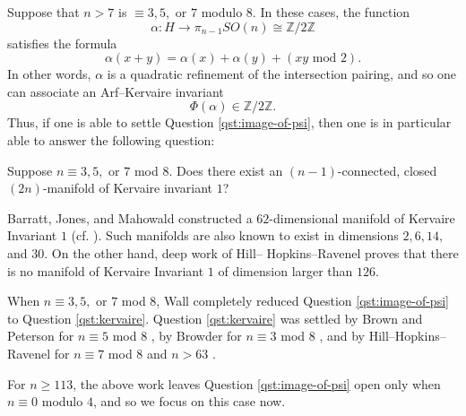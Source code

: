 \begin{exm}
Suppose that $n>7$ is $\equiv 3,5,$ or $7$ modulo $8$.  In these cases, the function
$$\alpha:H \to \pi_{n-1} SO(n) \cong \mathbb{Z}/2\mathbb{Z}$$
satisfies the formula
$$\alpha(x+y) = \alpha(x) + \alpha(y) + (xy \text{ mod }2).$$
In other words, $\alpha$ is a quadratic refinement of the intersection pairing, and so one can associate an Arf--Kervaire invariant
$$\Phi(\alpha) \in \mathbb{Z}/2\mathbb{Z}.$$
Thus, if one is able to settle Question \ref{qst:image-of-psi}, then one is in particular able to answer the following question:
\end{exm}

\begin{qst} \label{qst:kervaire}
Suppose $n \equiv 3,5,$ or $7$ mod $8$.  Does there exist an $(n-1)$-connected, closed $(2n)$-manifold of Kervaire invariant $1$?
\end{qst}

\begin{rmk}
Barratt, Jones, and Mahowald constructed a $62$-dimensional manifold of Kervaire Invariant $1$ \cite{BJMKervaire} (cf. \cite{XuKervaire}).  Such manifolds are also known to exist in dimensions $2,6,14,$ and $30$.  On the other hand, deep work of Hill-- Hopkins--Ravenel \cite{HHR} proves that there is no manifold of Kervaire Invariant $1$ of dimension larger than $126$.
\end{rmk}

\begin{rmk}
When $n \equiv 3,5,$ or $7$ mod $8$, Wall completely reduced \cite[Lemma 5]{Wall62} Question \ref{qst:image-of-psi} to Question \ref{qst:kervaire}.  Question \ref{qst:kervaire} was settled by Brown and Peterson for $n \equiv 5$ mod $8$ \cite{BPKervaire}, by Browder for $n \equiv 3$ mod $8$ \cite{BrowderKervaire}, and by Hill--Hopkins--Ravenel for $n \equiv 7$ mod $8$ and $n>63$ \cite{HHR}.
\end{rmk}

For $n \ge 113$, the above work leaves Question \ref{qst:image-of-psi} open only when $n \equiv 0$ modulo $4$, and so we focus on this case now.

